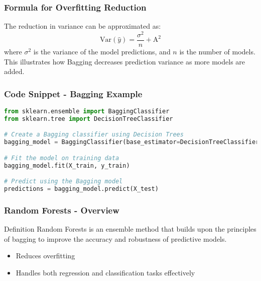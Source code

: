 \documentclass[aspectratio=169]{beamer}
\begin{document}
\begin{frame}[fragile]
    \frametitle{Formula for Overfitting Reduction}
    The reduction in variance can be approximated as:
    \begin{equation}
    \text{Var}(\hat{y}) = \frac{\sigma^2}{n} + \text{A}^2
    \end{equation}
    where $\sigma^2$ is the variance of the model predictions, and $n$ is the number of models. This illustrates how Bagging decreases prediction variance as more models are added.
\end{frame}

\begin{frame}[fragile]
    \frametitle{Code Snippet - Bagging Example}
    \begin{lstlisting}[language=Python]
from sklearn.ensemble import BaggingClassifier
from sklearn.tree import DecisionTreeClassifier

# Create a Bagging classifier using Decision Trees
bagging_model = BaggingClassifier(base_estimator=DecisionTreeClassifier(), n_estimators=100)

# Fit the model on training data
bagging_model.fit(X_train, y_train)

# Predict using the Bagging model
predictions = bagging_model.predict(X_test)
    \end{lstlisting}
\end{frame}

\begin{frame}[fragile]
    \frametitle{Random Forests - Overview}
    \begin{block}{Definition}
        Random Forests is an ensemble method that builds upon the principles of bagging to improve the accuracy and robustness of predictive models.
    \end{block}
    \begin{itemize}
        \item Reduces overfitting
        \item Handles both regression and classification tasks effectively
    \end{itemize}
\end{frame}
\end{document}
